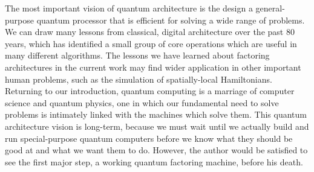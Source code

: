 The most important vision of quantum architecture is the design a general-purpose
quantum processor that is efficient for solving a wide range of
problems. We can draw many lessons from classical, digital architecture
over the past 80 years, which has identified a small group of
core operations which are useful in many different algorithms.
The lessons we have learned about factoring architectures in
the current work may find wider application in other important human
problems, such as the simulation of spatially-local Hamiltonians.
Returning to our introduction, 
quantum computing is a marriage of computer science and quantum physics,
one in which our fundamental need to solve problems is intimately
linked with the machines which solve them.
This quantum architecture
vision is long-term, because we must wait until we actually build and
run special-purpose quantum computers before we know what they should be
good at and what we want them to do. However, the author would be
satisfied to see the first major step, a working quantum factoring
machine, before his death.